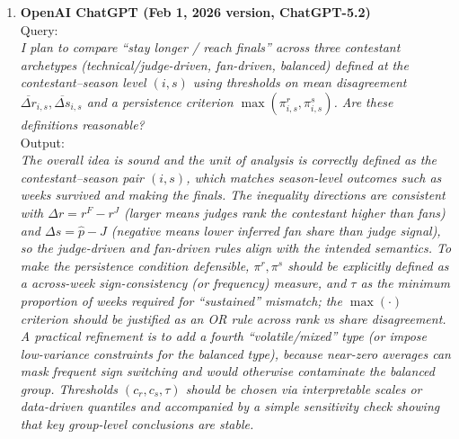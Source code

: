 \documentclass[12pt]{article}
\begin{document}
\begin{enumerate}
	
	\item \textbf{OpenAI ChatGPT (Feb 1, 2026 version, ChatGPT-5.2)}\\
	Query: \\
	\textit{I plan to compare ``stay longer / reach finals'' across three contestant archetypes (technical/judge-driven, fan-driven, balanced) defined at the contestant--season level \((i,s)\) using thresholds on mean disagreement \(\overline{\Delta r}_{i,s}, \overline{\Delta s}_{i,s}\) and a persistence criterion \(\max(\pi^r_{i,s},\pi^s_{i,s})\). Are these definitions reasonable?}\\
	Output: \\
	\textit{The overall idea is sound and the unit of analysis is correctly defined as the contestant--season pair \((i,s)\), which matches season-level outcomes such as weeks survived and making the finals. The inequality directions are consistent with \(\Delta r=r^F-r^J\) (larger means judges rank the contestant higher than fans) and \(\Delta s=\hat p-J\) (negative means lower inferred fan share than judge signal), so the judge-driven and fan-driven rules align with the intended semantics. To make the persistence condition defensible, \(\pi^r,\pi^s\) should be explicitly defined as a across-week sign-consistency (or frequency) measure, and \(\tau\) as the minimum proportion of weeks required for ``sustained'' mismatch; the \(\max(\cdot)\) criterion should be justified as an OR rule across rank vs share disagreement. A practical refinement is to add a fourth ``volatile/mixed'' type (or impose low-variance constraints for the balanced type), because near-zero averages can mask frequent sign switching and would otherwise contaminate the balanced group. Thresholds \((c_r,c_s,\tau)\) should be chosen via interpretable scales or data-driven quantiles and accompanied by a simple sensitivity check showing that key group-level conclusions are stable.}
	

\end{enumerate}
\end{document}
